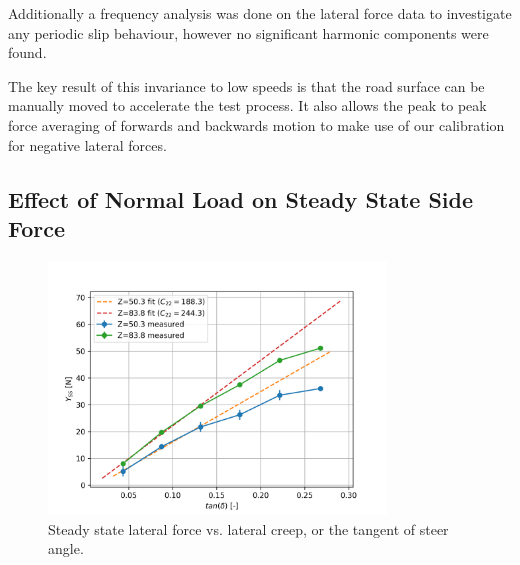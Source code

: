 \documentclass{article}
\begin{document}
Additionally a frequency analysis was done on the lateral force data to investigate any periodic slip behaviour,
however no significant harmonic components were found.

The key result of this invariance to low speeds is that the road surface can be manually moved to accelerate the test process.
It also allows the peak to peak force averaging of forwards and backwards motion to make use of our calibration for negative lateral forces.

\subsection{\textbf{Effect of Normal Load on Steady State Side Force}}

\begin{figure}[H]
    \centering
    \includegraphics[width=0.8\textwidth]{4.3/Yss_vs_tandelta.png}
    \caption{Steady state lateral force vs. lateral creep, or the tangent of steer angle.}
    \label{fig:lateral_force_vs_alpha}
\end{figure}
\end{document}
